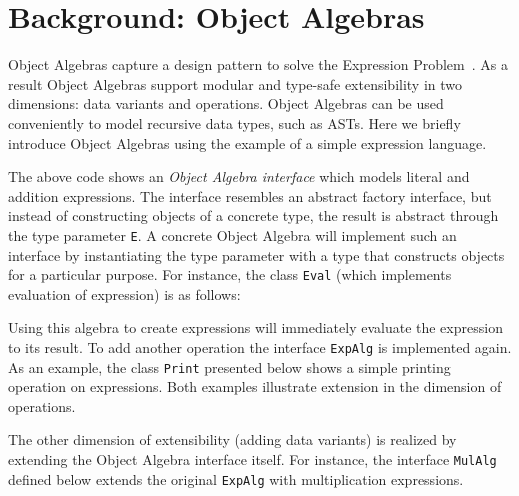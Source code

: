 \section{Background: Object Algebras}\label{subsec:ObjectAlgebras}

Object Algebras capture a design pattern to solve the Expression
Problem~\cite{wadler98expression-problem}.  As a result Object
Algebras support modular and type-safe extensibility in two
dimensions: data variants and operations. Object Algebras can be used
conveniently to model recursive data types, such as ASTs. Here we
briefly introduce Object Algebras using the example of a simple
expression language.


The above code shows an \emph{Object Algebra interface} which models
literal and addition expressions. The interface resembles an abstract
factory interface, but instead of constructing objects of a concrete
type, the result is abstract through the type parameter \lstinline{E}.
A concrete Object Algebra will implement such an interface by
instantiating the type parameter with a type that constructs objects
for a particular purpose. For instance, the class \lstinline{Eval}
(which implements evaluation of expression) is as follows:


Using this algebra to create expressions will immediately evaluate
the expression to its result. To add another operation the interface
\lstinline{ExpAlg} is implemented again. As an example, the class
\lstinline{Print} presented below shows a simple printing operation on
expressions. Both examples illustrate extension in the dimension of
operations.



The other dimension of extensibility (adding data variants) is
realized by extending the Object Algebra interface itself. For
instance, the interface \lstinline{MulAlg} defined below extends the
original \lstinline{ExpAlg} with multiplication expressions.

